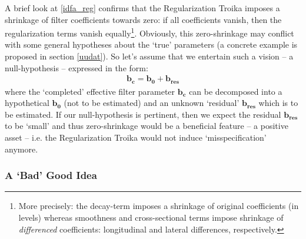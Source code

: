 \documentclass[11pt]{article}
\begin{document}
A brief look at \ref{idfa_reg} confirms that the Regularization Troika imposes a shrinkage of filter coefficients towards zero: if all coefficients vanish, then the regularization terms vanish equally\footnote{More precisely: the decay-term imposes a shrinkage of original coefficients (in levels) whereas smoothness and cross-sectional terms impose shrinkage of \emph{differenced} coefficients: longitudinal and lateral differences, respectively.}. Obviously, this zero-shrinkage may conflict with some general hypotheses about the `true' parameters (a concrete example is proposed in section \ref{uudat}). So let's assume that we entertain such a vision  -- a null-hypothesis -- expressed in the form:
\begin{eqnarray*}
\mathbf{b_{c}=b_0+b_{\textrm{res}}}
\end{eqnarray*}
where the `completed' effective filter parameter $\mathbf{b_{c}}$ can be decomposed into a hypothetical $\mathbf{b_0}$ (not to be estimated) and an unknown `residual' $\mathbf{b_{\textrm{res}}}$ which is to be estimated. If our null-hypothesis is pertinent, then we expect the residual $\mathbf{b_{\textrm{res}}}$ to be `small' and thus zero-shrinkage would be a beneficial feature -- a positive asset -- i.e. the Regularization Troika would not induce `misspecification' anymore.  

\subsubsection{A `Bad' Good Idea}
\end{document}

